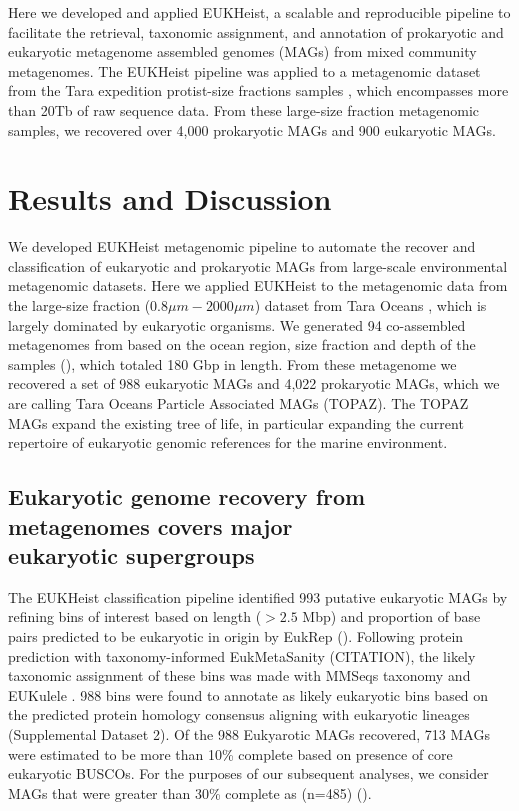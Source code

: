 \documentclass[12pt]{article}
\numberwithin{equation}{section}
\begin{document}
Here we developed and applied EUKHeist, a scalable and reproducible pipeline to facilitate the retrieval, taxonomic assignment, and annotation of prokaryotic and eukaryotic metagenome assembled genomes (MAGs) from mixed community metagenomes. The EUKHeist pipeline was applied to a metagenomic dataset from the Tara expedition protist-size fractions samples \citep{Carradec2018global}, which encompasses more than 20Tb of raw sequence data. From these large-size fraction metagenomic samples, we recovered over 4,000 prokaryotic MAGs and 900 eukaryotic MAGs. 

\section*{Results and Discussion}

We developed EUKHeist metagenomic pipeline to automate the recover and classification of eukaryotic and prokaryotic MAGs from large-scale environmental metagenomic datasets. Here we applied EUKHeist to the metagenomic data from the large-size fraction ($0.8\mu m-2000\mu m$) dataset from Tara Oceans \citep{Carradec2018global}, which is largely dominated by eukaryotic organisms. We generated 94 co-assembled metagenomes from based on the ocean region, size fraction and depth of the samples (), which totaled 180 Gbp in length.  From these metagenome we recovered a set of 988 eukaryotic MAGs and 4,022 prokaryotic MAGs, which we are calling Tara Oceans Particle Associated MAGs (TOPAZ). The TOPAZ MAGs expand the existing tree of life, in particular expanding the current repertoire of eukaryotic genomic references for the marine environment. 

\subsection*{Eukaryotic genome recovery from metagenomes covers major \\ eukaryotic supergroups}
The EUKHeist classification pipeline identified 993 putative eukaryotic MAGs by refining bins of interest based on length ($>2.5$ Mbp) and proportion of base pairs predicted to be eukaryotic in origin by EukRep (). Following protein prediction with taxonomy-informed EukMetaSanity (CITATION), the likely taxonomic assignment of these bins was made with MMSeqs taxonomy \citep{Steinegger2018} and EUKulele \citep{Krinos2021EUKulele}. 988 bins were found to annotate as likely eukaryotic bins based on the predicted protein homology consensus aligning with eukaryotic lineages (Supplemental Dataset 2). Of the 988 Eukyarotic MAGs recovered, 713 MAGs were estimated to be more than 10\% complete based on presence of core eukaryotic BUSCOs. For the purposes of our subsequent analyses, we consider MAGs that were greater than 30\% complete as (n=485) (). 
\end{document}
